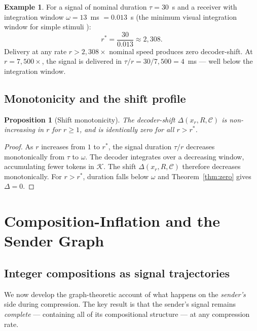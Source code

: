 \documentclass[twocolumn,11pt,a4paper]{article}
\theoremstyle{main}
\newtheorem{proposition}[theorem]{Proposition}
\theoremstyle{definition}
\newtheorem{example}[theorem]{Example}
\theoremstyle{remark}
\newcommand{\Know}{\mathcal{K}}
\newcommand{\Cell}{\mathcal{C}}
\newcommand{\Recv}{R}
\newcommand{\shift}{\Delta}
\newcommand{\rate}{r}
\newcommand{\window}{\omega}
\begin{document}
\begin{example}
\label{ex:rates}
For a signal of nominal duration $\tau = 30$~s and a receiver with
integration window $\window = 13$~ms $= 0.013$~s (the minimum visual
integration window for simple stimuli \citep{efron1970}):
\[
  \rate^* = \frac{30}{0.013} \approx 2{,}308.
\]
Delivery at any rate $\rate > 2{,}308\times$ nominal speed produces
zero decoder-shift. At $\rate = 7{,}500\times$, the signal is delivered
in $\tau / \rate = 30 / 7{,}500 = 4$~ms --- well below the integration
window.
\end{example}

\subsection{Monotonicity and the shift profile}

\begin{proposition}[Shift monotonicity]
\label{prop:monotone}
The decoder-shift $\shift(x_\rate, \Recv, \Cell)$ is non-increasing in
$\rate$ for $\rate \geq 1$, and is identically zero for all
$\rate > \rate^*$.
\end{proposition}

\begin{proof}
As $\rate$ increases from $1$ to $\rate^*$, the signal duration
$\tau/\rate$ decreases monotonically from $\tau$ to $\window$. The
decoder integrates over a decreasing window, accumulating fewer tokens
in $\Know$. The shift $\shift(x_\rate, \Recv, \Cell)$ therefore
decreases monotonically. For $\rate > \rate^*$, duration falls below
$\window$ and Theorem~\ref{thm:zero} gives $\shift = 0$.
\end{proof}

\section{Composition-Inflation and the Sender Graph}
\label{sec:compositions}

\subsection{Integer compositions as signal trajectories}

We now develop the graph-theoretic account of what happens on the
\emph{sender's} side during compression. The key result is that the
sender's signal remains \emph{complete} --- containing all of its
compositional structure --- at any compression rate.
\end{document}
